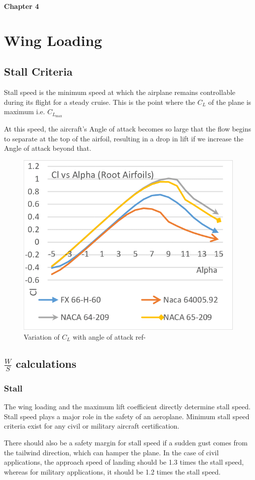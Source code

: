 \documentclass[12 pt]{article}
\begin{document}
\textbf{\Huge{Chapter 4}}

\section{Wing Loading}

\subsection{{Stall Criteria}}
Stall speed is the minimum speed at which the airplane remains controllable during its flight for a steady cruise.\cite{stall1} This is the point where the $C_L$ of the plane is maximum i.e. $C_{L_{\text{max}}}$

At this speed, the aircraft's Angle of attack becomes so large that the flow begins to separate at the top of the airfoil, resulting in a drop in lift if we increase the Angle of attack beyond that.

\begin{figure}[h]
    \centering
    \includegraphics[width=0.4\linewidth]{Extra pics/Cllvsalpha.png}
    \caption{Variation of $C_L$ with angle of attack ref- \cite{stallpic}}
    \label{Variation of $C_L$ with angle}
\end{figure}

\subsection{{ $\frac{W}{S}$ calculations } }

\subsubsection{{Stall}}

The wing loading and the maximum lift coefficient directly determine stall speed. Stall speed plays a major role in the safety of an aeroplane. Minimum stall speed criteria exist for any civil or military aircraft certification.

There should also be a safety margin for stall speed if a sudden gust comes from the tailwind direction, which can hamper the plane. In the case of civil applications, the approach speed of landing should be 1.3 times the stall speed, whereas for military applications, it should be 1.2 times the stall speed.
\end{document}
